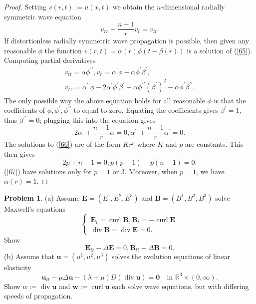 \documentclass[hyperref,UTF8,12pt]{article}
\numberwithin{equation}{subsection}
\theoremstyle{plain}
\theoremstyle{definition}
\newtheorem{problem}{Problem}
\numberwithin{theorem}{section}
\numberwithin{lemma}{section}
\numberwithin{proposition}{section}
\numberwithin{remark}{section}
\numberwithin{corollary}{section}
\numberwithin{definition}{section}
\numberwithin{problem}{section}
\numberwithin{example}{section}
\newcommand{\mr}{\mathbb{R}}
\newcommand{\divv}{\operatorname{div}}
\newcommand{\curl}{\operatorname{curl}}
\begin{document}
\begin{proof}
Setting $v(r,t):=u(x,t)$ we obtain the $n$-dimensional radially symmetric wave equation
\[v_{rr}+\frac{n-1}{r}v_r=v_{tt}.\tag{65}\label{65}\]
If distortionless radially symmetric wave propagation is possible, then given any reasonable $\phi$ the function $v(r,t)=\alpha(r)\phi(t-\beta(r))$ is a solution of (\ref{65}). Computing partial derivatives\[\begin{gathered}
	v_{tt}=\alpha\phi^{\prime\prime},v_r=\alpha^\prime\phi-\alpha\phi^\prime\beta^ \prime,\\v_{rr}=\alpha^{\prime\prime}\phi-2\alpha^\prime\phi^\prime\beta^\prime -\alpha\phi^{\prime\prime}(\beta^\prime)^2-\alpha\phi^\prime\beta^{\prime\prime}.
\end{gathered}\]The only possible way the above equation holds for all reasonable $\phi$ is that the coefficients of $\phi,\phi^\prime,\phi^{\prime\prime}$ to equal to zero. Equating the coefficients gives $\beta^\prime=1$, thus $\beta^{\prime\prime}=0$; plugging this into the equation gives\[2\alpha^{\prime}+\frac{n-1}{r}\alpha=0,\alpha^{\prime\prime} +\frac{n-1}{r}\alpha^\prime=0.\tag{66}\label{66}\]The solutions to (\ref{66}) are of the form $K r^p$ where $K$ and $p$ are constants. This then gives \[2p+n-1=0,p(p-1)+p(n-1)=0.\tag{67}\label{67}\](\ref{67}) have solutions only for $p=1$ or 3. Moreover, when $p=1$, we have $\alpha(r)=1$.
\end{proof}
\begin{problem}
(a) Assume $\mathbf{E}=(E^1,E^2,E^3)$ and $\mathbf{B}=(B^1,B^2,B^3)$ solve Maxwell's equations
\[\left\{\begin{array}{l}
	\mathbf{E}_t=\curl\mathbf{B},\mathbf{B}_t=-\curl\mathbf{E}\\
	\divv\mathbf{B}=\divv\mathbf{E}=0.
\end{array}\right.\]
Show\[\mathbf{E}_{tt}-\Delta\mathbf{E}=0,\mathbf{B}_{tt}-\Delta\mathbf{B}=0.\]
(b) Assume that $\mathbf{u}=(u^1,u^2,u^3)$ solves the evolution equations of linear elasticity
\[\mathbf{u}_{tt}-\mu\Delta\mathbf{u}-(\lambda+\mu)D(\divv\mathbf{u})= \mathbf{0}\quad\text{in }\mr^3\times(0,\infty).\]
Show $w:=\divv\mathbf{u}$ and $\mathbf{w}:=\curl\mathbf{u}$ each solve wave equations, but with differing speeds of propagation.
\end{problem}
\end{document}
